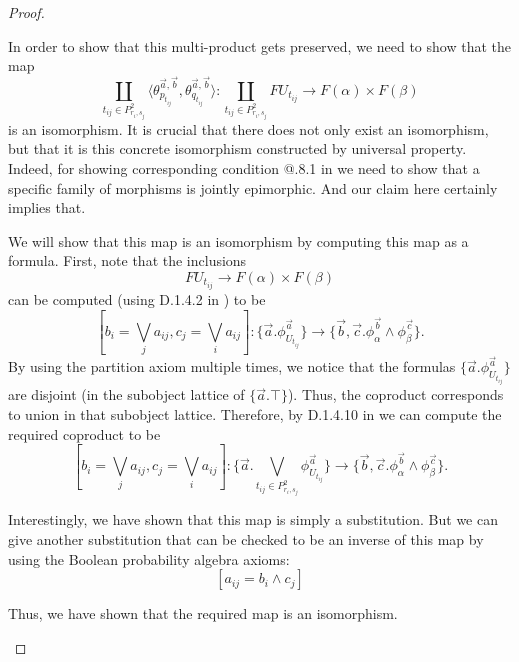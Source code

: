 \documentclass[a4paper]{amsproc}
\makeatletter
\theoremstyle{plain}
\theoremstyle{definition}
\theoremstyle{remark}
\numberwithin{equation}{section}
\newcommand{\Rmnum}[1]{\expandafter\@slowromancap\romannumeral #1@}
\makeatother
\begin{document}
\begin{proof}
\begin{enumerate}
        In order to show that this multi-product gets preserved, we need to show that the map
        \[
            \coprod_{t_{ij} \in P^2_{r_i,s_j}} \langle \theta^{\vec{a},\vec{b}}_{p_{t_{ij}}}, \theta^{\vec{a},\vec{b}}_{q_{t_{ij}}} \rangle : \coprod_{t_{ij} \in P^2_{r_i,s_j}} F U_{t_{ij}} \to F(\alpha) \times F(\beta)
        \]
        is an isomorphism. It is crucial that there does not only exist an isomorphism, but that it is this concrete isomorphism constructed by universal property. Indeed, for showing corresponding condition \Rmnum{7}.8.1 in \cite{maclane2012sheaves} we need to show that a specific family of morphisms is jointly epimorphic. And our claim here certainly implies that.

        We will show that this map is an isomorphism by computing this map as a formula. First, note that the inclusions
        \[
            FU_{t_{ij}} \to F(\alpha) \times F(\beta)
        \]
        can be computed (using D.1.4.2 in \cite{johnstone2002sketches2}) to be
        \[
            [ b_i = \bigvee_j a_{ij}, c_j = \bigvee_i a_{ij} ] :\{ \vec{a}. \phi^{\vec{a}}_{U_{t_{ij}}} \} \to \{ \vec{b},\vec{c} . \phi^{\vec{b}}_{\alpha} \wedge \phi^{\vec{c}}_{\beta} \} .
        \]
        By using the partition axiom multiple times, we notice that the formulas $\{ \vec{a} . \phi^{\vec{a}}_{U_{t_{ij}}}\}$ are disjoint (in the subobject lattice of $\{ \vec{a} . \top \}$). Thus, the coproduct corresponds to union in that subobject lattice. Therefore, by D.1.4.10 in \cite{johnstone2002sketches2} we can compute the required coproduct to be
        \[
            [ b_i = \bigvee_j a_{ij}, c_j = \bigvee_i a_{ij} ]: \{ \vec{a}.\bigvee_{t_{ij} \in P^2_{r_i,s_j} } \phi^{\vec{a}}_{U_{t_{ij}}} \} \to \{\vec{b},\vec{c} . \phi^{\vec{b}}_{\alpha} \wedge \phi^{\vec{c}}_{\beta}\}.
        \]

        Interestingly, we have shown that this map is simply a substitution. But we can give another substitution that can be checked to be an inverse of this map by using the Boolean probability algebra axioms:
        \[
            [a_{ij} = b_i \wedge c_j]
        \]

        Thus, we have shown that the required map is an isomorphism.


\end{enumerate}
\end{proof}
\end{document}
